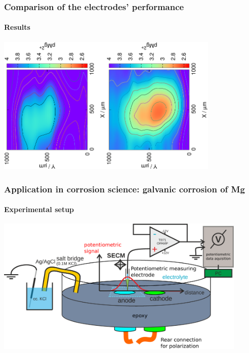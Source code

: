 \documentclass{beamer}
\begin{document}
\begin{frame}
	\frametitle{Comparison of the electrodes' performance} 
	\framesubtitle{Results}
	\centering
	\includegraphics[trim = 10mm 30mm 0mm 20mm, clip, width=0.4\textwidth, angle=-90]{liquid_Mg.eps}\hfill\includegraphics[trim = 10mm 30mm 0mm 20mm, clip, width=0.4\textwidth, angle=-90]{solid_Mg.eps}
\end{frame}

\begin{frame}
\frametitle{Application in corrosion science: galvanic corrosion of Mg}
\framesubtitle{Experimental setup}
\begin{center}
\includegraphics[width=0.9\textwidth]{model.eps}
\end{center}
\end{frame}
\end{document}
